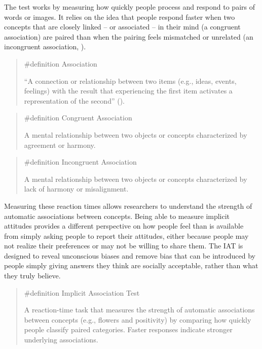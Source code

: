 \documentclass[
  letterpaper,
]{book}
\begin{document}
The test works by measuring how quickly people process and respond to
pairs of words or images. It relies on the idea that people respond
faster when two concepts that are closely linked -- or associated -- in
their mind (a congruent association) are paired than when the pairing
feels mismatched or unrelated (an incongruent association,
).

\begin{quote}
\label{def-association}{\#definition} Association

``A connection or relationship between two items (e.g., ideas, events,
feelings) with the result that experiencing the first item activates a
representation of the second'' ().
\end{quote}

\begin{quote}
\label{def-congruentassociation}{\#definition} Congruent
Association

A mental relationship between two objects or concepts characterized by
agreement or harmony.
\end{quote}

\begin{quote}
\label{def-incongruentassociation}{\#definition}
Incongruent Association

A mental relationship between two objects or concepts characterized by
lack of harmony or misalignment.
\end{quote}

Measuring these reaction times allows researchers to understand the
strength of automatic associations between concepts. Being able to
measure implicit attitudes provides a different perspective on how
people feel than is available from simply asking people to report their
attitudes, either because people may not realize their preferences or
may not be willing to share them. The IAT is designed to reveal
unconscious biases and remove bias that can be introduced by people
simply giving answers they think are socially acceptable, rather than
what they truly believe.

\begin{quote}
\label{def-implicitassociationtest}{\#definition}
Implicit Association Test

A reaction-time task that measures the strength of automatic
associations between concepts (e.g., flowers and positivity) by
comparing how quickly people classify paired categories. Faster
responses indicate stronger underlying associations.
\end{quote}
\end{document}
